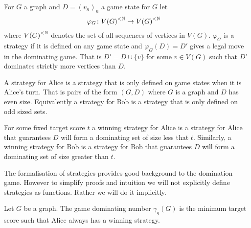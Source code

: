 \begin{definition}
    For $G$ a graph and $D=(v_n)_n$ a game state for $G$ let
    \begin{align*}        
        \varphi_G &\colon {V(G)}^{<\mathbb{N}} \to {V(G)}^{<\mathbb{N}} 
    \end{align*}
    where ${V(G)}^{<\mathbb{N}}$ denotes the set of all sequences of vertices in $V(G)$. $\varphi_G$ is a strategy if it is defined on any game state and $\varphi_G(D)=D'$ gives a legal move in the dominating game. That is $D'=D\cup \{v\}$ for some $v\in V(G)$ such that $D'$ dominates strictly more vertices than $D$. 
\end{definition}

A strategy for Alice is a strategy that is only defined on game states when it is Alice's turn. That is pairs of the form $(G,D)$ where $G$ is a graph and $D$ has even size. Equivalently a strategy for Bob is a strategy that is only defined on odd sized sets. 

For some fixed target score $t$ a winning strategy for Alice is a strategy for Alice that guarantees $D$ will form a dominating set of size less that $t$. Similarly, a winning strategy for Bob is a strategy for Bob that guarantees $D$ will form a dominating set of size greater than $t$.

The formalisation of strategies provides good background to the domination game. However to simplify proofs and intuition we will not explicitly define strategies as functions. Rather we will do it implicitly.    

\begin{definition}
    Let $G$ be a graph. The game dominating number $\gamma_g(G)$ is the minimum target score such that Alice always has a winning strategy.
\end{definition} 

%        
%
%    
%
%
%
%
%    
    

